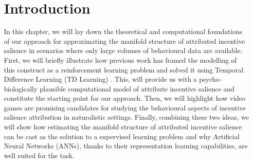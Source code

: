 \section{Introduction}
In this chapter, we will lay down the theoretical and computational foundations of our approach for approximating the manifold structure of attributed incentive salience in scenarios where only large volumes of behavioural data are available. First, we will briefly illustrate how previous work has framed the modelling of this construct as a reinforcement learning problem and solved it using Temporal Difference Learning (TD Learning) \cite{sutton1988learning}. This, will provide us with a psycho-biologically plausible computational model of attribute incentive salience and constitute the starting point for our approach. Then, we will highlight how video games are promising candidates for studying the behavioural aspects of incentive salience attribution in naturalistic settings. Finally, combining these two ideas, we will show how estimating the manifold structure of attributed incentive salience can be cast as the solution to a supervised learning problem and why Artificial Neural Networks (ANNs), thanks to their representation learning capabilities, are well suited for the task.

